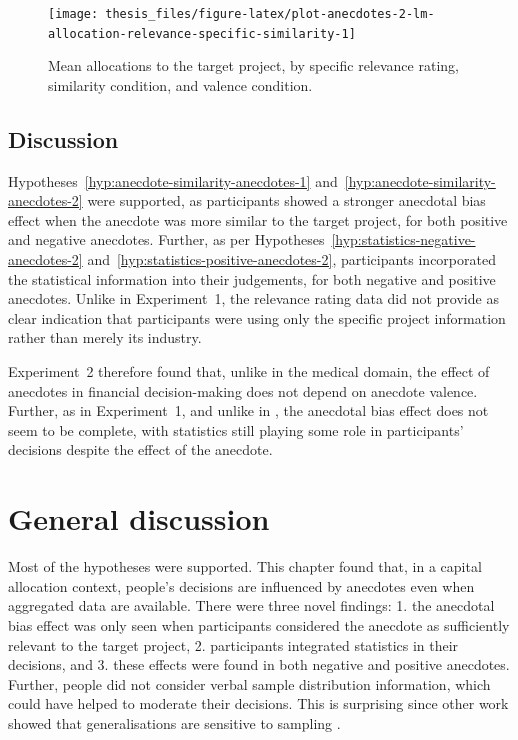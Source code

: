\documentclass[a4paper, nobind, dvipsnames]{templates/ociamthesis}
\theoremstyle{definition}
\theoremstyle{definition}
\theoremstyle{definition}
\theoremstyle{definition}
\theoremstyle{remark}
\begin{document}
\begin{figure}
\texttt{[image: thesis\_files/figure-latex/plot-anecdotes-2-lm-allocation-relevance-specific-similarity-1]} \caption{Mean allocations to the target project, by specific relevance rating, similarity condition, and valence condition.}\label{fig:plot-anecdotes-2-lm-allocation-relevance-specific-similarity}
\end{figure}

\subsection{Discussion}

Hypotheses~\ref{hyp:anecdote-similarity-anecdotes-1}
and~\ref{hyp:anecdote-similarity-anecdotes-2} were supported, as participants
showed a stronger anecdotal bias effect when the anecdote was more similar to
the target project, for both positive and negative anecdotes. Further, as per
Hypotheses~\ref{hyp:statistics-negative-anecdotes-2}
and~\ref{hyp:statistics-positive-anecdotes-2}, participants incorporated the
statistical information into their judgements, for both negative and positive
anecdotes. Unlike in Experiment~1, the relevance rating data did not provide as
clear indication that participants were using only the specific project
information rather than merely its industry.

Experiment~2 therefore found that, unlike in the medical domain, the effect of
anecdotes in financial decision-making does not depend on anecdote valence.
Further, as in Experiment~1, and unlike in \textcite{wainberg2013}, the anecdotal bias
effect does not seem to be complete, with statistics still playing some role in
participants' decisions despite the effect of the anecdote.

\section{General discussion}

Most of the hypotheses were supported. This chapter found that, in a capital
allocation context, people's decisions are influenced by anecdotes even when
aggregated data are available. There were three novel findings: 1. the anecdotal
bias effect was only seen when participants considered the anecdote as
sufficiently relevant to the target project, 2. participants integrated
statistics in their decisions, and 3. these effects were found in both negative
and positive anecdotes. Further, people did not consider verbal sample
distribution information, which could have helped to moderate their decisions.
This is surprising since other work showed that generalisations are sensitive to
sampling \autocite{carvalho2021}.
\end{document}
